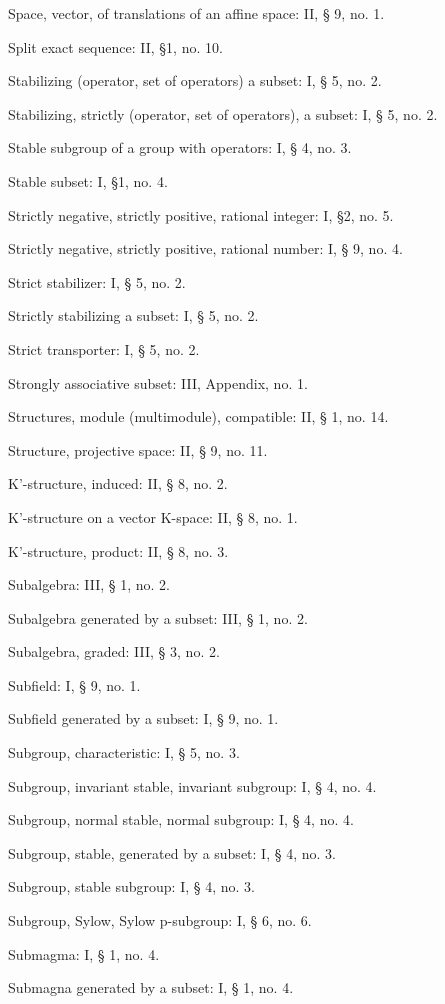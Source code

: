 Space, vector, of translations of an affine space: II, § 9, no. 1.

Split exact sequence: II, §1, no. 10.

Stabilizing (operator, set of operators) a subset: I, § 5, no. 2.

Stabilizing, strictly (operator, set of operators), a subset: I, § 5, no. 2.

Stable subgroup of a group with operators: I, § 4, no. 3.

Stable subset: I, §1, no. 4.

Strictly negative, strictly positive, rational integer: I, §2, no. 5.

Strictly negative, strictly positive, rational number: I, § 9, no. 4.

Strict stabilizer: I, § 5, no. 2.

Strictly stabilizing a subset: I, § 5, no. 2.

Strict transporter: I, § 5, no. 2.

Strongly associative subset: III, Appendix, no. 1.

Structures, module (multimodule), compatible: II, § 1, no. 14.

Structure, projective space: II, § 9, no. 11.

K'-structure, induced: II, § 8, no. 2.

K'-structure on a vector K-space: II, § 8, no. 1.

K'-structure, product: II, § 8, no. 3.

Subalgebra: III, § 1, no. 2.

Subalgebra generated by a subset: III, § 1, no. 2.

Subalgebra, graded: III, § 3, no. 2.

Subfield: I, § 9, no. 1.

Subfield generated by a subset: I, § 9, no. 1.

Subgroup, characteristic: I, § 5, no. 3.

Subgroup, invariant stable, invariant subgroup: I, § 4, no. 4.

Subgroup, normal stable, normal subgroup: I, § 4, no. 4.

Subgroup, stable, generated by a subset: I, § 4, no. 3.

Subgroup, stable subgroup: I, § 4, no. 3.

Subgroup, Sylow, Sylow p-subgroup: I, § 6, no. 6.

Submagma: I, § 1, no. 4.

Submagna generated by a subset: I, § 1, no. 4.

